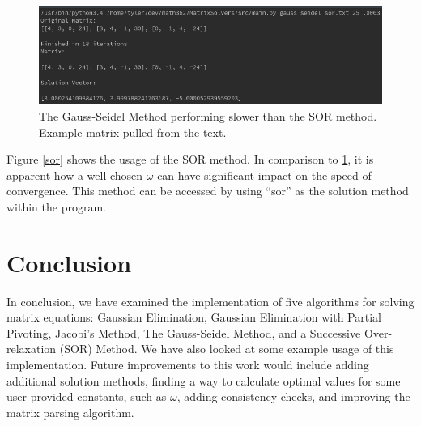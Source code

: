\documentclass[12pt]{article}
\begin{document}
\begin{figure}[H]
\begin{center}
\includegraphics[scale=.5]{slow_seidel.png}
\caption{The Gauss-Seidel Method performing slower than the SOR method. Example matrix
pulled from the text\cite{numerical}.}
\label{slow_seidel}
\end{center}
\end{figure}

Figure \ref{sor} shows the usage of the SOR method. In comparison to \ref{slow_seidel},
it is apparent how a well-chosen $\omega$ can have significant impact on the 
speed of convergence. This method can be accessed by using ``sor''
as the solution method within the program.



\section{Conclusion}
In conclusion, we have examined the implementation of 
 five algorithms for solving matrix equations: Gaussian Elimination, Gaussian Elimination with
Partial Pivoting, Jacobi's Method, The Gauss-Seidel Method, and a 
Successive Over-relaxation (SOR) Method. We have also looked at some example 
usage of this implementation. Future improvements to this work would include
adding additional solution methods, finding a way to calculate optimal values 
for some user-provided constants, such as $\omega$, adding consistency checks, 
and improving the matrix parsing algorithm.

\newpage

\nocite{*}
\end{document}
